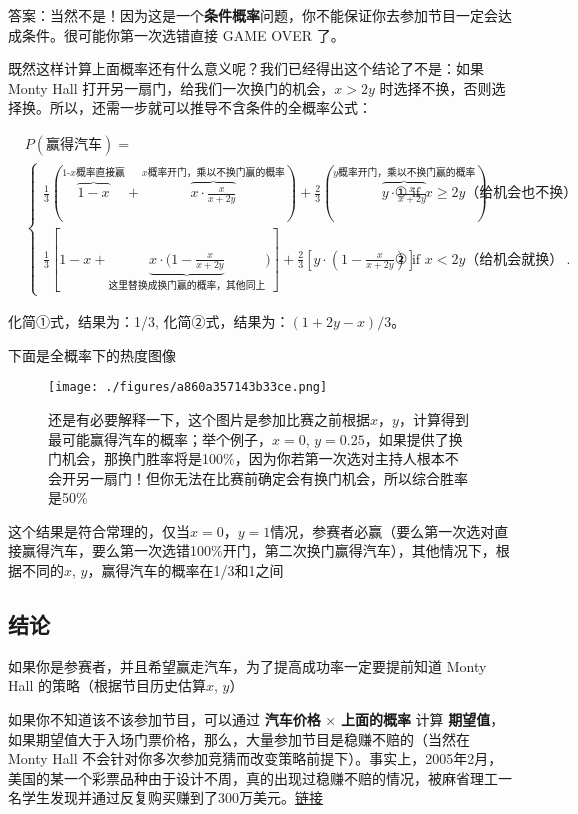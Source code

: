 答案：当然不是！因为这是一个\textbf{条件概率}问题，你不能保证你去参加节目一定会达成条件。很可能你第一次选错直接 GAME OVER 了。

既然这样计算上面概率还有什么意义呢？我们已经得出这个结论了不是：如果 Monty Hall 打开另一扇门，给我们一次换门的机会，$x>2y$ 时选择不换，否则选择换。所以，还需一步就可以推导不含条件的全概率公式：

$$
\begin{aligned}
&P(\text{赢得汽车})=\\
&\begin{cases}
 \frac{1}{3}(\overbrace{1-x}^{\text{1-$x$概率直接赢}}+\overbrace{x\cdot \frac{x}{x+2y}}^{\text{$x$概率开门，乘以不换门赢的概率}})+\frac{2}{3}(\overbrace{y\cdot \frac{x}{x+2y}}^{\text{$y$概率开门，乘以不换门赢的概率}})& \text{ ① if } x\ge2y\text{（给机会也不换）}\\
 \frac{1}{3}[1-x+\underbrace{x\cdot(1- \frac{x}{x+2y}}_{\text{这里替换成换门赢的概率，其他同上}})]+\frac{2}{3}[y\cdot(1- \frac{x}{x+2y})]& \text{ ② if } x\lt2y\text{（给机会就换）}~.
\end{cases}
\end{aligned}
$$

化简①式，结果为：1/3,
化简②式，结果为：$(1+2y-x)/3$。

下面是全概率下的热度图像

\begin{figure}[ht]
\centering
\texttt{[image: ./figures/a860a357143b33ce.png]}
\caption{还是有必要解释一下，这个图片是参加比赛之前根据$x$，$y$，计算得到最可能赢得汽车的概率；举个例子，$x=0$, $y=0.25$，如果提供了换门机会，那换门胜率将是100$\%$，因为你若第一次选对主持人根本不会开另一扇门！但你无法在比赛前确定会有换门机会，所以综合胜率是50$\%$} \label{fig_MontyH2}
\end{figure}

这个结果是符合常理的，仅当$x=0$，$y=1$情况，参赛者必赢（要么第一次选对直接赢得汽车，要么第一次选错100\%开门，第二次换门赢得汽车），其他情况下，根据不同的$x$, $y$，赢得汽车的概率在1/3和1之间

\subsection{结论}
如果你是参赛者，并且希望赢走汽车，为了提高成功率一定要提前知道 Monty Hall 的策略（根据节目历史估算$x$, $y$）

如果你不知道该不该参加节目，可以通过 \textbf{汽车价格} × \textbf{上面的概率} 计算 \textbf{期望值}，如果期望值大于入场门票价格，那么，大量参加节目是稳赚不赔的（当然在 Monty Hall 不会针对你多次参加竞猜而改变策略前提下）。事实上，2005年2月，美国的某一个彩票品种由于设计不周，真的出现过稳赚不赔的情况，被麻省理工一名学生发现并通过反复购买赚到了300万美元。\href{https://www.ruanyifeng.com/blog/2018/04/lottery-mathematics.html}{链接}

